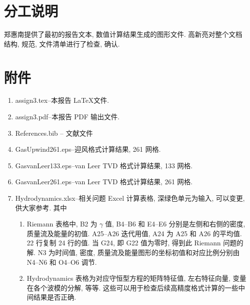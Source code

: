 \documentclass[10.5pt
]{article}
\begin{document}
\section{分工说明}

郑惠南提供了最初的报告文本, 数值计算结果生成的图形文件. 高新亮对整个文档结构, 规范, 文件清单进行了检查, 确认.

\section{附件}

\begin{enumerate}
\item
assign3.tex--本报告 \LaTeX  文件.
\item
assign3.pdf--本报告 PDF 输出文件.
\item
References.bib -- 文献文件
\item
GasUpwind261.eps--迎风格式计算结果, 261 网格.
\item
GasvanLeer133.eps--van Leer TVD 格式计算结果, 133 网格.
\item
GasvanLeer261.eps--van Leer TVD 格式计算结果, 261 网格.
\item
Hydrodynamics.xlsx--相关问题 Excel 计算表格, 深绿色单元为输入, 可以变更, 供大家参考. 其中
\begin{enumerate}
\item
  Riemann 表格中, B2 为 $\gamma$ 值, B4--B6 和 E4--E6 分别是左侧和右侧的密度, 质量流及能量的初值. A25--A26 迭代用值, A24 为 A25 和 A26 的平均值.
  22 行复制 24 行的值. 当 G24, 即 G22 值为零时, 得到此 Riemann 问题的解. N3 为时间值, 密度, 质量流及能量图形的坐标初值和对应比例分别由 N4--N6 和 O4--O6 调节.
\item
Hydrodynamics 表格为对应守恒型方程的矩阵特征值, 左右特征向量, 变量在各个波模的分解, 等等. 这些可以用于检查后续高精度格式计算的一些中间结果是否正确.
\end{enumerate}
\end{enumerate}



\end{document}
